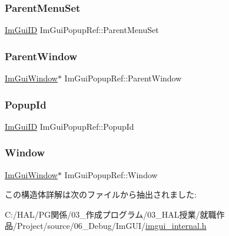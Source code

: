\subsubsection{\texorpdfstring{Parent\+Menu\+Set}{ParentMenuSet}}
{\footnotesize\ttfamily \mbox{\hyperlink{imgui_8h_a1785c9b6f4e16406764a85f32582236f}{Im\+Gui\+ID}} Im\+Gui\+Popup\+Ref\+::\+Parent\+Menu\+Set}

\mbox{\label{struct_im_gui_popup_ref_a7925cc312e5632661e0e6a2195af21b2}} 
\subsubsection{\texorpdfstring{Parent\+Window}{ParentWindow}}
{\footnotesize\ttfamily \mbox{\hyperlink{struct_im_gui_window}{Im\+Gui\+Window}}$\ast$ Im\+Gui\+Popup\+Ref\+::\+Parent\+Window}

\mbox{\label{struct_im_gui_popup_ref_a7037780575e28439414d28625a495bad}} 
\subsubsection{\texorpdfstring{Popup\+Id}{PopupId}}
{\footnotesize\ttfamily \mbox{\hyperlink{imgui_8h_a1785c9b6f4e16406764a85f32582236f}{Im\+Gui\+ID}} Im\+Gui\+Popup\+Ref\+::\+Popup\+Id}

\mbox{\label{struct_im_gui_popup_ref_a471027209038d1d59280a84c8d236f34}} 
\subsubsection{\texorpdfstring{Window}{Window}}
{\footnotesize\ttfamily \mbox{\hyperlink{struct_im_gui_window}{Im\+Gui\+Window}}$\ast$ Im\+Gui\+Popup\+Ref\+::\+Window}



この構造体詳解は次のファイルから抽出されました\+:\begin{DoxyCompactItemize}
\item 
C\+:/\+H\+A\+L/\+P\+G関係/03\+\_\+作成プログラム/03\+\_\+\+H\+A\+L授業/就職作品/\+Project/source/06\+\_\+\+Debug/\+Im\+G\+U\+I/\mbox{\hyperlink{imgui__internal_8h}{imgui\+\_\+internal.\+h}}\end{DoxyCompactItemize}
